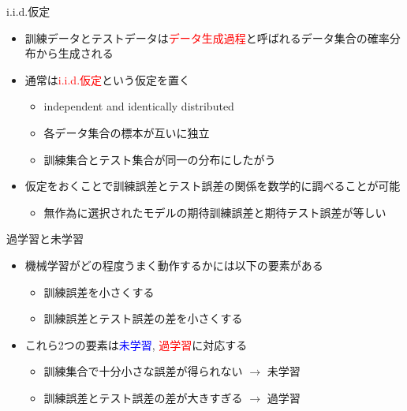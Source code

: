 \documentclass[dvipdfmx, 10pt]{beamer}
\newcommand{\green}[1]{\textcolor{green!40!black}{#1}}
\begin{document}

\begin{frame}{i.i.d.仮定}
  \begin{itemize}
    \item 訓練データとテストデータは\textcolor{red}{データ生成過程}と呼ばれるデータ集合の確率分布から生成される
    \item 通常は\textcolor{red}{i.i.d.仮定}という仮定を置く
    \begin{itemize}
      \item independent and identically distributed
      \item 各データ集合の標本が互いに独立
      \item 訓練集合とテスト集合が同一の分布にしたがう
    \end{itemize}
    \item 仮定をおくことで訓練誤差とテスト誤差の関係を数学的に調べることが可能
    \begin{itemize}
      \item 無作為に選択されたモデルの期待訓練誤差と期待テスト誤差が等しい
    \end{itemize}
  \end{itemize}
\end{frame}


\begin{frame}{過学習と未学習}
  \begin{itemize}
    \item 機械学習がどの程度うまく動作するかには以下の要素がある
    \begin{itemize}
      \item 訓練誤差を小さくする
      \item 訓練誤差とテスト誤差の差を小さくする
    \end{itemize}
    \item これら2つの要素は\textcolor{blue}{未学習}, \textcolor{red}{過学習}に対応する
    \begin{itemize}
      \item 訓練集合で十分小さな誤差が得られない $\to$ 未学習
      \item 訓練誤差とテスト誤差の差が大きすぎる $\to$ 過学習
    \end{itemize}
  \end{itemize}
\end{frame}

\end{document}
